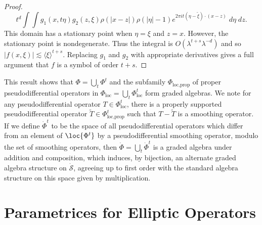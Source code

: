 \begin{proof}
    \[ t^d \int \int g_1(x, t \eta) g_2(z,\xi) \rho(|x - z|) \rho(|\eta| - 1) e^{2 \pi i t (\eta - \tilde{\xi}) \cdot (x - z)}\; d\eta\; dz. \]
    This domain has a stationary point when $\eta = \xi$ and $z = x$. However, the stationary point is nondegenerate. Thus the integral is $O(\lambda^{t + s} \lambda^{-d})$ and so $|f(x,\xi)| \lesssim \langle \xi \rangle^{t + s}$. Replacing $g_1$ and $g_2$ with appropriate derivatives gives a full argument that $f$ is a symbol of order $t + s$.
\end{proof}

\begin{remark}
    This result shows that $\Phi = \bigcup_t \Phi^t$ and the subfamily $\Phi_{\text{loc},\text{prop}}$ of proper pseudodifferential operators in $\Phi_{\text{loc}} = \bigcup_t \Phi^t_{\text{loc}}$ form graded algebras. We note for any pseudodifferential operator $T \in \Phi^t_{\text{loc}}$, there is a properly supported pseudodifferential operator $\tilde{T} \in \Phi_{\text{loc},\text{prop}}^t$ such that $T - \tilde{T}$ is a smoothing operator. If we define $\dot{\Phi}^t$ to be the space of all pseudodifferential operators which differ from an element of $\loc{\Phi^t}$ by a pseudodifferential smoothing operator, modulo the set of smoothing operators, then $\dot{\Phi} = \bigcup_t \dot{\Phi}^t$ is a graded algebra under addition and composition, which induces, by bijection, an alternate graded algebra structure on $\dot{\mathcal{S}}$, agreeing up to first order with the standard algebra structure on this space given by multiplication.
\end{remark}

\section{Parametrices for Elliptic Operators}

